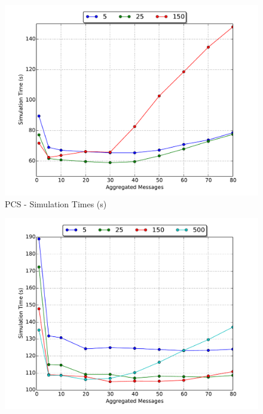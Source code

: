 \documentclass[11pt]{book}
\begin{document}
\begin{figure}
  \begin{minipage}{.5\textwidth}
    \begin{center}
      \includegraphics[width=\textwidth,keepaspectratio,quiet]{figs/partitioning_communication/aggregate_pcs_time.pdf} \\
      PCS - Simulation Times (s) \\
    \end{center}
  \end{minipage}%
  \hfill
  \begin{minipage}{.5\textwidth}
    \begin{center}
      \includegraphics[width=\textwidth,keepaspectratio,quiet]{figs/partitioning_communication/aggregate_traffic_time.pdf} \\

\end{center}
\end{minipage}
\end{figure}
\end{document}
